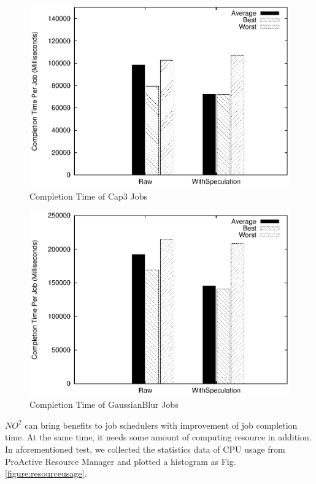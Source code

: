 \begin{figure}
\centering
\includegraphics[width=0.9\columnwidth]{figures/completiontime_cap3.eps}
\caption{Completion Time of Cap3 Jobs}
\label{figure:completiontime_cap3}
\end{figure}

\begin{figure}
\centering
\includegraphics[width=0.9\columnwidth]{figures/completiontime_gaussianblur.eps}
\caption{Completion Time of GaussianBlur Jobs}
\label{figure:completiontime_gaussianblur}
\end{figure}

$NO^2$ can bring benefits to job schedulers with improvement of job completion time. At the same time, it needs some amount of computing resource in addition. In aforementioned test, we collected the statistics data of CPU usage from ProActive Resource Manager and plotted a histogram as Fig. \ref{figure:resourceusage}.

